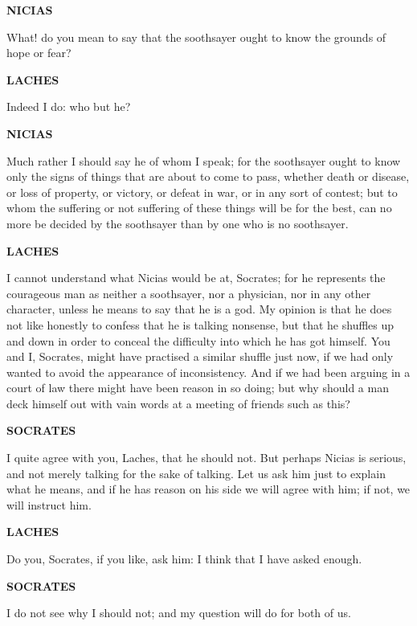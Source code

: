 \documentclass[11pt,letter]{book}
\begin{document}
\par \textbf{NICIAS}
\par   What! do you mean to say that the soothsayer ought to know the grounds of hope or fear?

\par \textbf{LACHES}
\par   Indeed I do:  who but he?

\par \textbf{NICIAS}
\par   Much rather I should say he of whom I speak; for the soothsayer ought to know only the signs of things that are about to come to pass, whether death or disease, or loss of property, or victory, or defeat in war, or in any sort of contest; but to whom the suffering or not suffering of these things will be for the best, can no more be decided by the soothsayer than by one who is no soothsayer.

\par \textbf{LACHES}
\par   I cannot understand what Nicias would be at, Socrates; for he represents the courageous man as neither a soothsayer, nor a physician, nor in any other character, unless he means to say that he is a god. My opinion is that he does not like honestly to confess that he is talking nonsense, but that he shuffles up and down in order to conceal the difficulty into which he has got himself. You and I, Socrates, might have practised a similar shuffle just now, if we had only wanted to avoid the appearance of inconsistency. And if we had been arguing in a court of law there might have been reason in so doing; but why should a man deck himself out with vain words at a meeting of friends such as this?

\par \textbf{SOCRATES}
\par   I quite agree with you, Laches, that he should not. But perhaps Nicias is serious, and not merely talking for the sake of talking. Let us ask him just to explain what he means, and if he has reason on his side we will agree with him; if not, we will instruct him.

\par \textbf{LACHES}
\par   Do you, Socrates, if you like, ask him:  I think that I have asked enough.

\par \textbf{SOCRATES}
\par   I do not see why I should not; and my question will do for both of us.
\end{document}

